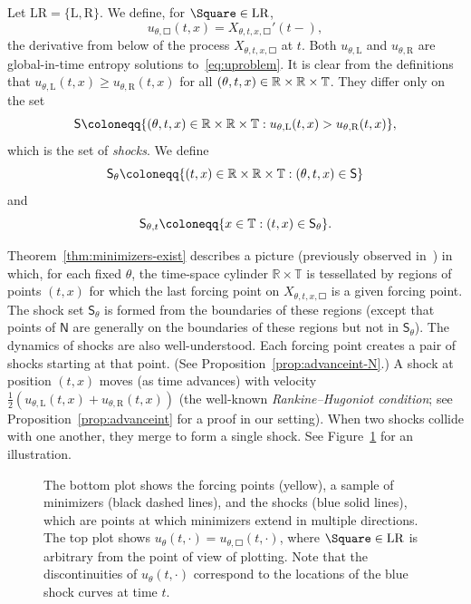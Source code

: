 \documentclass[AHL,Unicode,longabstracts]{cedram}
\newcommand*\ssS{\mathsf{S}}
\newcommand*\ssN{\mathsf{N}}
\newcommand*\TT{\mathbb{T}}
\newcommand*\RR{\mathbb{R}}
\newcommand*\st{\mathrel{:}}
\newcommand*\Left{\mathrm{L}}
\newcommand*\Right{\mathrm{R}}
\newcommand*\LR{\mathrm{LR}}
\let\oldin\in
\renewcommand{\in}{\mathchoice{\oldin}{\oldin}{\,\oldin\,}{\,\oldin\,}}
\let\originalleft\left
\let\originalright\right
\renewcommand{\left}{\mathopen{}\mathclose\bgroup\originalleft}
\renewcommand{\right}{\aftergroup\egroup\originalright}
\newcommand*\TT{\mathbb{T}}
\newcommand*\RR{\mathbb{R}}
\begin{document}
Let $\LR=\{\Left,\Right\}$. We define, for $\Square\in\LR$,
\begin{equation}\label{eq:udef}
u_{\theta,\Square}(t,x)=X_{\theta,t,x,\Square}'(t-),
\end{equation}
the derivative from below of the process $X_{\theta,t,x,\Square}$ at $t$. Both $u_{\theta,\Left}$ and $u_{\theta,\Right}$ are global-in-time entropy solutions to~\eqref{eq:uproblem}. It is clear from the definitions that $u_{\theta,\Left}(t,x)\ge u_{\theta,\Right}(t,x)$ for all $(\theta,t,x)\in\RR\times\RR\times\TT$. They differ only on the set
\begin{equation}\label{eq:Sdef}
\ssS\coloneqq\left\{(\theta,t,x)\in\RR\times\RR\times\TT\st u_{\theta,\Left}(t,x)>u_{\theta,\Right}(t,x)\right\},
\end{equation}
which is the set of \emph{shocks}. We define
\begin{equation}\label{eq:Sthetadef}
\ssS_{\theta}\coloneqq\{(t,x)\in\RR\times\RR\times\TT\st(\theta,t,x)\in\ssS\}
\end{equation}
and
\begin{equation}\label{eq:Sthetatdef}
\ssS_{\theta,t}\coloneqq\{x\in\TT\st(t,x)\in\ssS_{\theta}\}.
\end{equation}

Theorem~\ref{thm:minimizers-exist} describes a picture (previously observed in~\cite{Bak13}) in which, for each fixed $\theta$, the time-space cylinder $\RR\times\TT$ is tessellated by regions of points $(t,x)$ for which the last forcing point on $X_{\theta,t,x,\Square}$ is a given forcing point. The shock set $\ssS_{\theta}$ is formed from the boundaries of these regions (except that points of $\ssN$ are generally on the boundaries of these regions but not in $\ssS_{\theta}$). The dynamics of shocks are also well-understood. Each forcing point creates a pair of shocks starting at that point. (See Proposition~\ref{prop:advanceint-N}.) A shock at position $(t,x)$ moves (as time advances) with velocity $\frac{1}{2}(u_{\theta,\Left}(t,x)+u_{\theta,\Right}(t,x))$ (the well-known \emph{Rankine--Hugoniot condition}; see Proposition~\ref{prop:advanceint} for a proof in our setting). When two shocks collide with one another, they merge to form a single shock. See Figure~\ref{fig:shocks_picture} for an illustration.

\begin{figure}[!hbp]
\begin{centering}

\end{centering}
\caption[Forcing points, minimizers, shocks, and the Burgers solution.]{The bottom plot shows the forcing points (yellow), a sample of minimizers (black dashed lines), and the shocks (blue solid lines), which are points at which minimizers extend in multiple directions. The top plot shows $u_{\theta}(t,\cdot)=u_{\theta,\Square}(t,\cdot)$, where $\Square\in\protect\LR$ is arbitrary from the point of view of plotting. Note that the discontinuities of $u_{\theta}(t,\cdot)$ correspond to the locations of the blue shock curves at time $t$.}
\label{fig:shocks_picture}
\end{figure}
\end{document}
